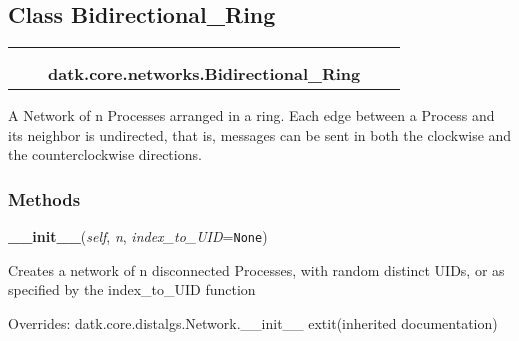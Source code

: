 
\subsection{Class Bidirectional\_Ring}

    \label{datk:core:networks:Bidirectional_Ring}
\begin{tabular}{cccccc}
\multicolumn{2}{r}{\settowidth{\BCL}{datk.core.distalgs.Network}\multirow{2}{\BCL}{datk.core.distalgs.Network}}
&&
  \\\cline{3-3}
  &&\multicolumn{1}{c|}{}
&&
  \\
&&\multicolumn{2}{l}{\textbf{datk.core.networks.Bidirectional\_Ring}}
\end{tabular}

A Network of n Processes arranged in a ring. Each edge between a Process 
and its neighbor is undirected, that is, messages can be sent in both the 
clockwise and the counterclockwise directions.



  \subsubsection{Methods}

    \vspace{0.5ex}

\hspace{.8\funcindent}\begin{boxedminipage}{\funcwidth}

    \raggedright \textbf{\_\_init\_\_}(\textit{self}, \textit{n}, \textit{index\_to\_UID}={\tt None})

\setlength{\parskip}{2ex}
    Creates a network of n disconnected Processes, with random distinct 
    UIDs, or as specified by the index\_to\_UID function

\setlength{\parskip}{1ex}
      Overrides: datk.core.distalgs.Network.\_\_init\_\_ 	extit{(inherited documentation)}

    \end{boxedminipage}


